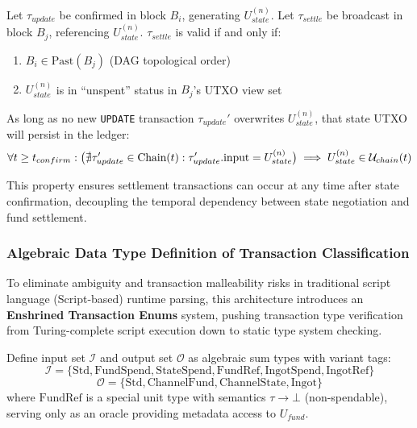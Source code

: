 \begin{definition}
Let $\tau_{update}$ be confirmed in block $B_i$, generating $U_{state}^{(n)}$.
Let $\tau_{settle}$ be broadcast in block $B_j$, referencing $U_{state}^{(n)}$.
$\tau_{settle}$ is valid if and only if:
\begin{enumerate}
    \item $B_i \in \text{Past}(B_j)$ (DAG topological order)
    \item $U_{state}^{(n)}$ is in ``unspent'' status in $B_j$'s UTXO view set
\end{enumerate}
\end{definition}

\begin{theorem}
As long as no new \texttt{UPDATE} transaction $\tau_{update}'$ overwrites $U_{state}^{(n)}$, that state UTXO will persist in the ledger:
$$\forall t \geq t_{confirm}: \bigl(\nexists \tau_{update}' \in \text{Chain}(t) : \tau_{update}'.\text{input} = U_{state}^{(n)}\bigr) \implies U_{state}^{(n)} \in \mathcal{U}_{chain}(t)$$
\end{theorem}

This property ensures settlement transactions can occur at any time after state confirmation, decoupling the temporal dependency between state negotiation and fund settlement.

\subsubsection{Algebraic Data Type Definition of Transaction Classification}

To eliminate ambiguity and transaction malleability risks in traditional script language (Script-based) runtime parsing, this architecture introduces an \textbf{Enshrined Transaction Enums} system, pushing transaction type verification from Turing-complete script execution down to static type system checking.

\begin{definition}
Define input set $\mathcal{I}$ and output set $\mathcal{O}$ as algebraic sum types with variant tags:
$$\mathcal{I} = \{\text{Std}, \text{FundSpend}, \text{StateSpend}, \text{FundRef}, \text{IngotSpend}, \text{IngotRef}\}$$
$$\mathcal{O} = \{\text{Std}, \text{ChannelFund}, \text{ChannelState}, \text{Ingot}\}$$
where $\text{FundRef}$ is a special unit type with semantics $\tau \to \bot$ (non-spendable), serving only as an oracle providing metadata access to $U_{fund}$.
\end{definition}

